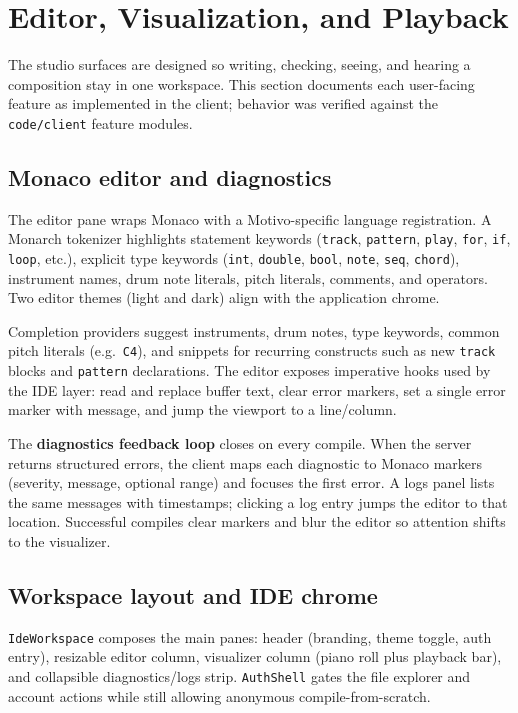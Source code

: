 \section{Editor, Visualization, and Playback}\label{sec:editor-visualization}

The studio surfaces are designed so writing, checking, seeing, and hearing a composition stay in one workspace.
This section documents each user-facing feature as implemented in the client; behavior was verified against the
\texttt{code/client} feature modules.

\subsection{Monaco editor and diagnostics}\label{subsec:monaco-editor}

The editor pane wraps Monaco with a Motivo-specific language registration.
A Monarch tokenizer highlights statement keywords (\texttt{track}, \texttt{pattern}, \texttt{play}, \texttt{for},
\texttt{if}, \texttt{loop}, etc.), explicit type keywords (\texttt{int}, \texttt{double}, \texttt{bool},
\texttt{note}, \texttt{seq}, \texttt{chord}), instrument names, drum note literals, pitch literals, comments, and
operators.
Two editor themes (light and dark) align with the application chrome.

Completion providers suggest instruments, drum notes, type keywords, common pitch literals (e.g.\ \texttt{C4}),
and snippets for recurring constructs such as new \texttt{track} blocks and \texttt{pattern} declarations.
The editor exposes imperative hooks used by the IDE layer: read and replace buffer text, clear error markers, set a
single error marker with message, and jump the viewport to a line/column.

The \textbf{diagnostics feedback loop} closes on every compile.
When the server returns structured errors, the client maps each diagnostic to Monaco markers (severity, message,
optional range) and focuses the first error.
A logs panel lists the same messages with timestamps; clicking a log entry jumps the editor to that location.
Successful compiles clear markers and blur the editor so attention shifts to the visualizer.

\subsection{Workspace layout and IDE chrome}\label{subsec:ide-workspace}

\texttt{IdeWorkspace} composes the main panes: header (branding, theme toggle, auth entry), resizable editor column,
visualizer column (piano roll plus playback bar), and collapsible diagnostics/logs strip.
\texttt{AuthShell} gates the file explorer and account actions while still allowing anonymous compile-from-scratch.

